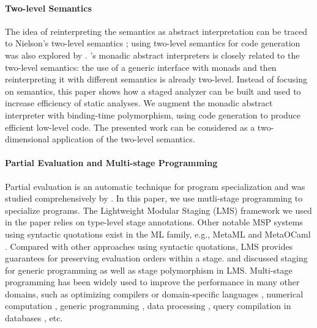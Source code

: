 \paragraph{Two-level Semantics} The idea of reinterpreting the semantics as
abstract interpretation can be traced to Nielson's two-level semantics
\cite{NIELSON1989117}; using two-level semantics for code generation
was also explored by \citet{NIELSON198859}.
\citet{Sergey:2013:MAI:2491956.2491979}'s monadic abstract
interpreters is closely related to the two-level semantics: the
use of a generic interface with monads and then reinterpreting it with
different semantics is already two-level. Instead of focusing on
semantics, this paper shows how a staged analyzer can be built and
used to increase efficiency of static analyses. We augment the monadic
abstract interpreter with binding-time polymorphism, using code generation to
produce efficient low-level code. The presented work can be considered as
a two-dimensional application of the two-level semantics.

\paragraph{Partial Evaluation and Multi-stage Programming}
Partial evaluation is an automatic technique for program
specialization and was studied comprehensively by
\citet{10.1007/3-540-61580-6_11, DBLP:books/daglib/0072559}.
In this paper, we use mutli-stage programming to specialize programs.
The Lightweight Modular Staging (LMS) framework
\cite{DBLP:conf/gpce/RompfO10} we used in the paper relies on
type-level stage annotations.  Other notable MSP systems using syntactic
quotations exist in the ML family, e.g., MetaML \cite{DBLP:conf/pepm/TahaS97}
and MetaOCaml \cite{DBLP:conf/gpce/CalcagnoTHL03, DBLP:conf/flops/Kiselyov14}. 
Compared with other approaches using syntactic quotations, LMS provides
guarantees for preserving evaluation orders within a stage.
\citet{Ofenbeck:2017:SGP:3136040.3136060} and
\citet{Amin:2017:CTI:3177123.3158140} discussed staging for generic programming
as well as stage polymorphism in LMS.
Multi-stage programming has been widely used to improve the
performance in many other domains, such as optimizing compilers or
domain-specific languages \cite{DBLP:conf/pldi/RompfSBLCO14,
  DBLP:conf/snapl/RompfBLSJAOSKDK15,
  DBLP:journals/tecs/SujeethBLRCOO14, DBLP:conf/gpce/SujeethGBLROO13,
  DBLP:journals/jfp/CaretteKS09}, numerical computation \cite{PGL-038,
  DBLP:conf/pepm/AktemurKKS13}, generic programming
\cite{DBLP:journals/pacmpl/Yallop17,
  Ofenbeck:2017:SGP:3136040.3136060}, data processing
\cite{DBLP:conf/oopsla/JonnalageddaCSRO14,
  DBLP:conf/popl/KiselyovBPS17}, query compilation in databases
\cite{DBLP:conf/osdi/EssertelTDBOR18, DBLP:conf/sigmod/TahboubER18},
etc.

